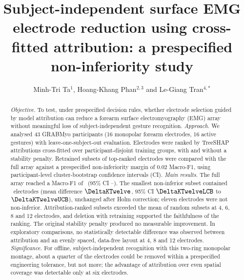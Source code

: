 \documentclass{iopjournal}
\begin{document}
\title{Subject-independent surface EMG electrode reduction using cross-fitted attribution: a prespecified non-inferiority study}

\author{Minh-Tri Ta$^1$, Hoang-Khang Phan$^{2,3}$ and Le-Giang Tran$^{4,*}$}








\begin{abstract}
\textit{Objective.} To test, under prespecified decision rules, whether electrode selection guided by model attribution can reduce a forearm surface electromyography (EMG) array without meaningful loss of subject-independent gesture recognition.
\textit{Approach.} We analysed 43 GRABMyo participants (16 monopolar forearm electrodes, 16 active gestures) with leave-one-subject-out evaluation. Electrodes were ranked by TreeSHAP attributions cross-fitted over participant-disjoint training groups, with and without a stability penalty. Retrained subsets of top-ranked electrodes were compared with the full array against a prespecified non-inferiority margin of 0.02 Macro-F1, using participant-level cluster-bootstrap confidence intervals (CI).
\textit{Main results.} The full array reached a Macro-F1 of \FullXGB\ (95\% CI \FullXGBLCB--\FullXGBUCB). The smallest non-inferior subset contained \KStar\ electrodes (mean difference $\DeltaKTwelve$, 95\% CI $\DeltaKTwelveLCB$ to $\DeltaKTwelveUCB$), unchanged after Holm correction; eleven electrodes were not non-inferior. Attribution-ranked subsets exceeded the mean of random subsets at 4, 6, 8 and 12 electrodes, and deletion with retraining supported the faithfulness of the ranking. The original stability penalty produced no measurable improvement.  In exploratory comparisons, no statistically detectable difference was observed between attribution and an evenly spaced, data-free layout at 4, 8 and 12 electrodes.
\textit{Significance.} For offline, subject-independent recognition with this two-ring monopolar montage, about a quarter of the electrodes could be removed within a prespecified engineering tolerance, but not more; the advantage of attribution over even spatial coverage was detectable only at six electrodes.
\end{abstract}
\end{document}

